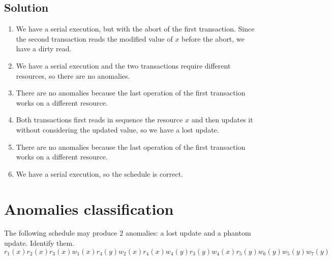 \documentclass[12pt, a4paper]{report}
\newtheorem[style=M,bodystyle=\normalfont]{theorem}{Theorem}
\newtheorem[style=M,bodystyle=\normalfont]{corollary}{Corollary}
\newtheorem[style=M,bodystyle=\normalfont]{lemma}{Lemma}
\newtheorem[style=M,bodystyle=\normalfont]{definition}{Definition}
\begin{document}
    \subsection*{Solution}
        \begin{enumerate}
            \item We have a serial execution, but with the abort of the first transaction. Since the second transaction reads the modified value of $x$ before the abort, we have a
                dirty read. 
            \item We have a serial execution and the two transactions require different resources, so there are no anomalies.
            \item There are no anomalies because the last operation of the first transaction works on a different resource. 
            \item Both transactions first reads in sequence the resource $x$ and then updates it without considering the updated value, so we have a lost update. 
            \item There are no anomalies because the last operation of the first transaction works on a different resource. 
            \item We have a serial execution, so the schedule is correct. 
        \end{enumerate}

    \newpage

    \section{Anomalies classification}
        The following schedule may produce 2 anomalies: a lost update and a phantom update. Identify them. 
        \[r_1(x) r_2(x) r_3(x) w_1(x) r_4(y) w_2(x) r_4(x) w_4(y) r_3(y)w_4(x) r_5(y) w_6(y) w_5(y) w_7(y)\]
\end{document}
